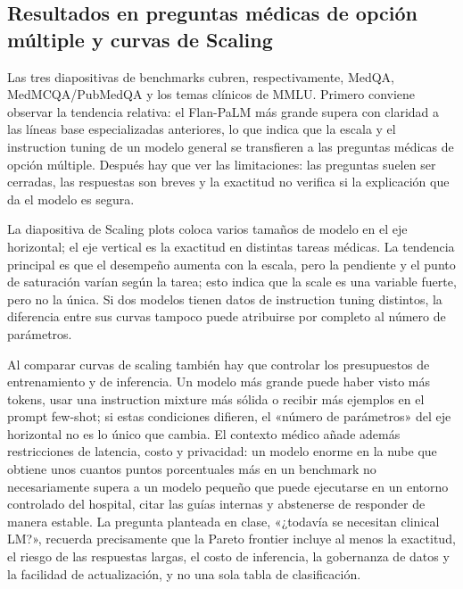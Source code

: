 \subsection{Resultados en preguntas médicas de opción múltiple y curvas de Scaling}

Las tres diapositivas de benchmarks cubren, respectivamente, MedQA, MedMCQA/PubMedQA y los temas clínicos de MMLU. Primero conviene observar la tendencia relativa: el Flan-PaLM más grande supera con claridad a las líneas base especializadas anteriores, lo que indica que la escala y el instruction tuning de un modelo general se transfieren a las preguntas médicas de opción múltiple. Después hay que ver las limitaciones: las preguntas suelen ser cerradas, las respuestas son breves y la exactitud no verifica si la explicación que da el modelo es segura.




La diapositiva de Scaling plots coloca varios tamaños de modelo en el eje horizontal; el eje vertical es la exactitud en distintas tareas médicas. La tendencia principal es que el desempeño aumenta con la escala, pero la pendiente y el punto de saturación varían según la tarea; esto indica que la scale es una variable fuerte, pero no la única. Si dos modelos tienen datos de instruction tuning distintos, la diferencia entre sus curvas tampoco puede atribuirse por completo al número de parámetros.


Al comparar curvas de scaling también hay que controlar los presupuestos de entrenamiento y de inferencia. Un modelo más grande puede haber visto más tokens, usar una instruction mixture más sólida o recibir más ejemplos en el prompt few-shot; si estas condiciones difieren, el «número de parámetros» del eje horizontal no es lo único que cambia. El contexto médico añade además restricciones de latencia, costo y privacidad: un modelo enorme en la nube que obtiene unos cuantos puntos porcentuales más en un benchmark no necesariamente supera a un modelo pequeño que puede ejecutarse en un entorno controlado del hospital, citar las guías internas y abstenerse de responder de manera estable. La pregunta planteada en clase, «¿todavía se necesitan clinical LM?», recuerda precisamente que la Pareto frontier incluye al menos la exactitud, el riesgo de las respuestas largas, el costo de inferencia, la gobernanza de datos y la facilidad de actualización, y no una sola tabla de clasificación.


